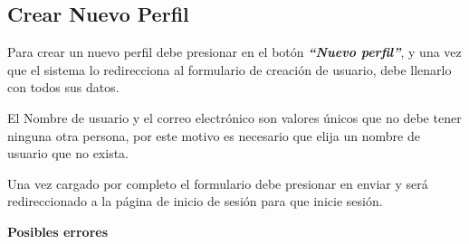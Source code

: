 \documentclass[a4paper,12pt]{article}
\begin{document}
\subsection{Crear Nuevo Perfil}
Para crear un nuevo perfil debe presionar en el botón \textbf{\textit{``Nuevo perfil''}}, y una vez que el sistema lo redirecciona al formulario de creación de usuario, debe llenarlo con todos sus datos.

El Nombre de usuario y el correo electrónico son valores únicos que no debe tener ninguna otra persona, por este motivo es necesario que elija un nombre de usuario que no exista. 

Una vez cargado por completo el formulario debe presionar en enviar y será redireccionado a la página de inicio de sesión para que inicie sesión.

\textbf{Posibles errores}
\end{document}
